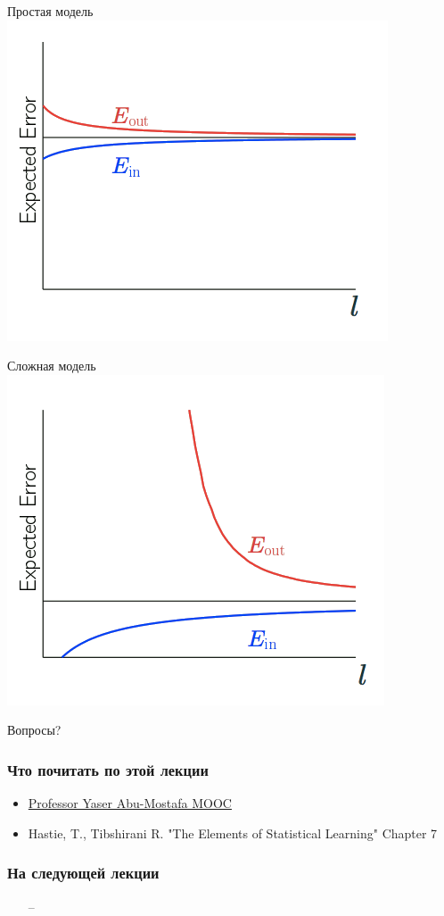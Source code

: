 \documentclass[10pt]{beamer}
\begin{document}
\begin{frame}{Простая модель}
  \centering
  \includegraphics[width=0.8 \textwidth, keepaspectratio]{images/simple_model}
\end{frame}

\begin{frame}{Сложная модель}
  \centering
  \includegraphics[width=0.8 \textwidth, keepaspectratio]{images/complex_model}
\end{frame}

\begin{frame}[standout]
  Вопросы?
\end{frame}

\appendix

\begin{frame}\frametitle{Что почитать по этой лекции}
  \begin{itemize}
    \item \href{http://work.caltech.edu/telecourse.html}{Professor Yaser Abu-Mostafa MOOC}
    \item  Hastie, T., Tibshirani R. "The Elements of Statistical Learning" Chapter 7 
  \end{itemize}
\end{frame}

\begin{frame}\frametitle{На следующей лекции}
	\begin{itemize}
    	\item[--]  	    	
	\end{itemize}
\end{frame}
\end{document}
